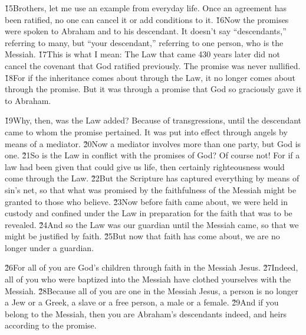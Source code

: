 \v{15}Brothers, let me use an example from everyday life. Once an agreement has been ratified, no one can cancel it or add conditions to it. \v{16}Now the promises were spoken to Abraham and to his descendant. It doesn't say ``descendants,'' referring to many, but ``your descendant,'' referring to one person, who is the Messiah. \v{17}This is what I mean: The Law that came 430 years later did not cancel the covenant that God ratified previously. The promise was never nullified. \v{18}For if the inheritance comes about through the Law, it no longer comes about through the promise. But it was through a promise that God so graciously gave it to Abraham.

\v{19}Why, then, was the Law added? Because of transgressions, until the descendant came to whom the promise pertained. It was put into effect through angels by means of a mediator. \v{20}Now a mediator involves more than one party, but God is one. \v{21}So is the Law in conflict with the promises of God? Of course not! For if a law had been given that could give us life, then certainly righteousness would come through the Law. \v{22}But the Scripture has captured everything by means of sin's net, so that what was promised by the faithfulness of the Messiah might be granted to those who believe. \v{23}Now before faith came about, we were held in custody and confined under the Law in preparation for the faith that was to be revealed. \v{24}And so the Law was our guardian until the Messiah came, so that we might be justified by faith. \v{25}But now that faith has come about, we are no longer under a guardian.

\v{26}For all of you are God's children through faith in the Messiah Jesus. \v{27}Indeed, all of you who were baptized into the Messiah have clothed yourselves with the Messiah. \v{28}Because all of you are one in the Messiah Jesus, a person is no longer a Jew or a Greek, a slave or a free person, a male or a female. \v{29}And if you belong to the Messiah, then you are Abraham's descendants indeed, and heirs according to the promise.

